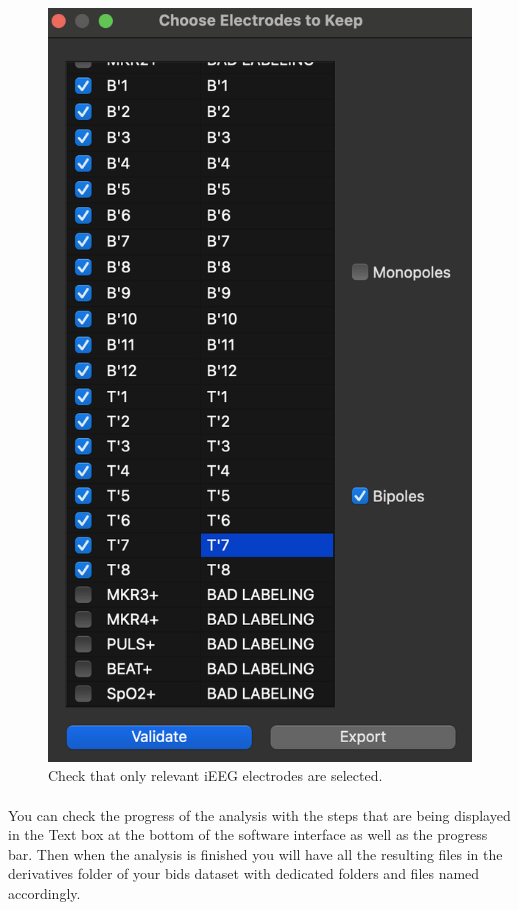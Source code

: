 \documentclass[a4paper]{article}
\begin{document}
\begin{figure}[H]
\begin{center}
\includegraphics[scale=0.6]{ConnectCleaner.png}
\end{center}
\caption{\label{ConnectCleanerBidsSubjectUI}Check that only relevant iEEG electrodes are selected.}
\end{figure}

\paragraph{} You can check the progress of the analysis with the steps that are being displayed in the Text box at the bottom of the software interface as well as the progress bar. Then when the analysis is finished you will have all the resulting files in the derivatives folder of your bids dataset with dedicated folders and files named accordingly.
\end{document}

